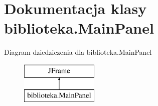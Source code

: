 \hypertarget{classbiblioteka_1_1_main_panel}{}\section{Dokumentacja klasy biblioteka.\+Main\+Panel}
\label{classbiblioteka_1_1_main_panel}
Diagram dziedziczenia dla biblioteka.\+Main\+Panel\begin{figure}[H]
\begin{center}
\leavevmode
\includegraphics[height=2.000000cm]{classbiblioteka_1_1_main_panel}
\end{center}
\end{figure}
